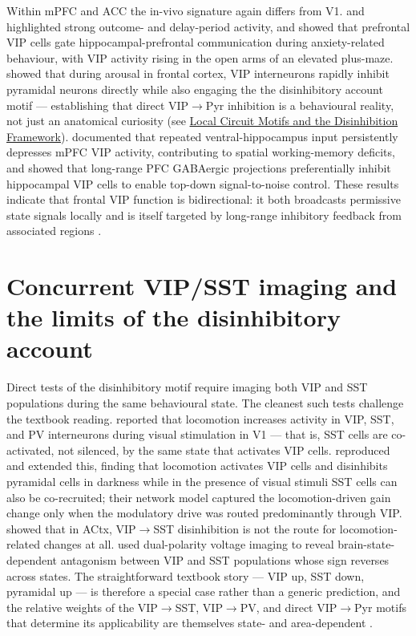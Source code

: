 \documentclass[11pt]{article}
\let\origrightarrow\rightarrow
\def\rightarrow{\ensuremath{\origrightarrow}}
\begin{document}
Within mPFC and ACC the in-vivo signature again differs from V1. \citet{Pinto2015} and \citet{Kamigaki2017} highlighted strong outcome- and delay-period activity, and \citet{Lee2019} showed that prefrontal VIP cells gate hippocampal-prefrontal communication during anxiety-related behaviour, with VIP activity rising in the open arms of an elevated plus-maze. \citet{Garciajuncoclemente2017} showed that during arousal in frontal cortex, VIP interneurons rapidly inhibit pyramidal neurons directly while also engaging the the disinhibitory account motif --- establishing that direct VIP\rightarrow Pyr inhibition is a behavioural reality, not just an anatomical curiosity (see \href{/disinhibition-framework}{Local Circuit Motifs and the Disinhibition Framework}). \citet{Silverstein2025} documented that repeated ventral-hippocampus input persistently depresses mPFC VIP activity, contributing to spatial working-memory deficits, and \citet{Malik2022} showed that long-range PFC GABAergic projections preferentially inhibit hippocampal VIP cells to enable top-down signal-to-noise control. These results indicate that frontal VIP function is bidirectional: it both broadcasts permissive state signals locally and is itself targeted by long-range inhibitory feedback from associated regions \citep{Malik2022, Silverstein2025}.

\section{Concurrent VIP/SST imaging and the limits of the disinhibitory account}

Direct tests of the disinhibitory motif require imaging both VIP and SST populations during the same behavioural state. The cleanest such tests challenge the textbook reading. \citet{Pakan2016} reported that locomotion increases activity in VIP, SST, and PV interneurons during visual stimulation in V1 --- that is, SST cells are co-activated, not silenced, by the same state that activates VIP cells. \citet{Dipoppa2018} reproduced and extended this, finding that locomotion activates VIP cells and disinhibits pyramidal cells in darkness while in the presence of visual stimuli SST cells can also be co-recruited; their network model captured the locomotion-driven gain change only when the modulatory drive was routed predominantly through VIP. \citet{Yavorska2021} showed that in ACtx, VIP\rightarrow SST disinhibition is not the route for locomotion-related changes at all. \citet{Kannan2022} used dual-polarity voltage imaging to reveal brain-state-dependent antagonism between VIP and SST populations whose sign reverses across states. The straightforward textbook story --- VIP up, SST down, pyramidal up --- is therefore a special case rather than a generic prediction, and the relative weights of the VIP\rightarrow SST, VIP\rightarrow PV, and direct VIP\rightarrow Pyr motifs that determine its applicability are themselves state- and area-dependent \citep{Garciajuncoclemente2017, Kannan2022, Veit2023}.
\end{document}
